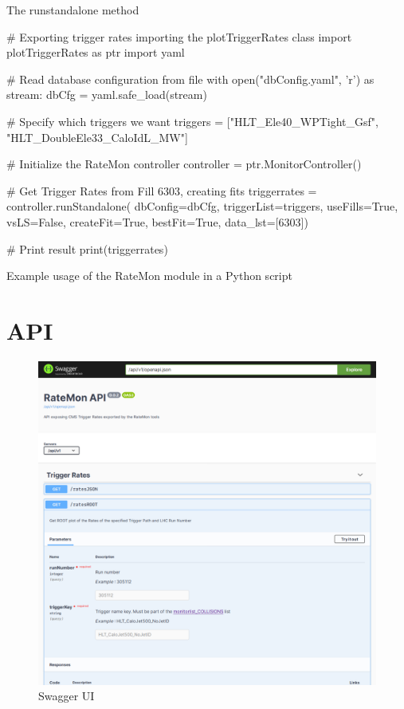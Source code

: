 The runstandalone method \cite{RestructuretheplotTriggerRatescripttobeusedasamodule7MergeRequestsCMSTSGFOGratemonGitLab-2020-10-07}


\begin{listing}[ht]
\begin{pythoncode}
# Exporting trigger rates importing the plotTriggerRates class
import plotTriggerRates as ptr
import yaml

# Read database configuration from file
with open("dbConfig.yaml", 'r') as stream:
    dbCfg = yaml.safe_load(stream)

# Specify which triggers we want
triggers = ["HLT_Ele40_WPTight_Gsf",
              "HLT_DoubleEle33_CaloIdL_MW"]

# Initialize the RateMon controller
controller = ptr.MonitorController()

# Get Trigger Rates from Fill 6303, creating fits
triggerrates = controller.runStandalone(
                         dbConfig=dbCfg,
                         triggerList=triggers,
                         useFills=True,
                         vsLS=False,
                         createFit=True,
                         bestFit=True,
                         data_lst=[6303])

# Print result
print(triggerrates)
\end{pythoncode}
\caption{Example usage of the RateMon module in a Python script}
\end{listing}

\section{API}

\cite{ExposefunctionalitieswithaRestfulAPI8MergeRequestsCMSTSGFOGratemonGitLab-2020-10-07}

\begin{figure}
    \centerline{
        \includegraphics[width=0.8\paperwidth]{figures/swagger-ui}}
    \caption{Swagger UI}
    \label{fig:swagger-ui}
\end{figure}

